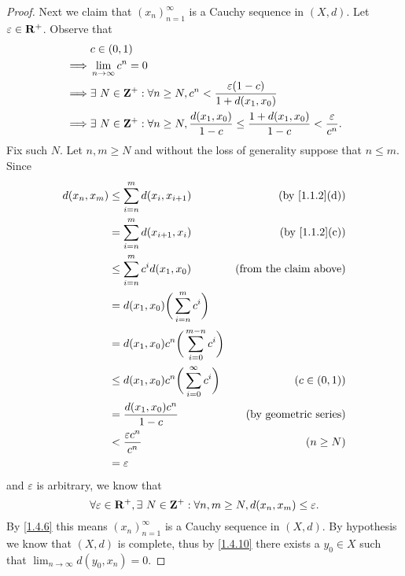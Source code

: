 \begin{proof}
  Next we claim that \((x_n)_{n = 1}^\infty\) is a Cauchy sequence in \((X, d)\).
  Let \(\varepsilon \in \mathbf{R}^+\).
  Observe that
  \begin{align*}
             & c \in (0, 1)                                                                                                                    \\
    \implies & \lim_{n \to \infty} c^n = 0                                                                                                     \\
    \implies & \exists\ N \in \mathbf{Z}^+ : \forall n \geq N, c^n < \frac{\varepsilon (1 - c)}{1 + d(x_1, x_0)}                                       \\
    \implies & \exists\ N \in \mathbf{Z}^+ : \forall n \geq N, \frac{d(x_1, x_0)}{1 - c} \leq \frac{1 + d(x_1, x_0)}{1 - c} < \frac{\varepsilon}{c^n}.
  \end{align*}
  Fix such \(N\).
  Let \(n, m \geq N\) and without the loss of generality suppose that \(n \leq m\).
  Since
  \begin{align*}
    d(x_n, x_m) & \leq \sum_{i = n}^m d(x_i, x_{i + 1})                    & \text{(by \cref{1.1.2}(d))}   \\
                & = \sum_{i = n}^m d(x_{i + 1}, x_i)                       & \text{(by \cref{1.1.2}(c))}   \\
                & \leq \sum_{i = n}^m c^i d(x_1, x_0)                      & \text{(from the claim above)} \\
                & = d(x_1, x_0) \bigg(\sum_{i = n}^m c^i\bigg)                                             \\
                & = d(x_1, x_0) c^n \bigg(\sum_{i = 0}^{m - n} c^i\bigg)                                   \\
                & \leq d(x_1, x_0) c^n \bigg(\sum_{i = 0}^\infty c^i\bigg) & (c \in (0, 1))                \\
                & = \frac{d(x_1, x_0) c^n}{1 - c}                          & \text{(by geometric series)}  \\
                & < \frac{\varepsilon c^n}{c^n}                            & (n \geq N)                    \\
                & = \varepsilon
  \end{align*}
  and \(\varepsilon\) is arbitrary, we know that
  \[
    \forall \varepsilon \in \mathbf{R}^+, \exists\ N \in \mathbf{Z}^+ : \forall n, m \geq N, d(x_n, x_m) \leq \varepsilon.
  \]
  By \cref{1.4.6} this means \((x_n)_{n = 1}^\infty\) is a Cauchy sequence in \((X, d)\).
  By hypothesis we know that \((X, d)\) is complete, thus by \cref{1.4.10} there exists a \(y_0 \in X\) such that \(\lim_{n \to \infty} d(y_0, x_n) = 0\).


\end{proof}
